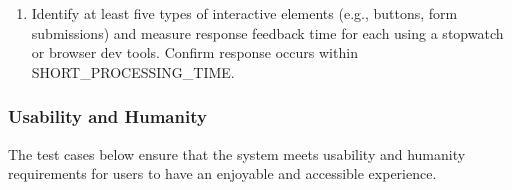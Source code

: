\documentclass[12pt, titlepage]{article}
\begin{document}
\begin{itemize}
\begin{mdframed}[linewidth=0.5mm]
\begin{enumerate}[noitemsep]
      \item Identify at least five types of interactive elements (e.g., buttons, form \\ submissions) and measure response feedback time for each using a stopwatch or browser dev tools. Confirm response occurs within \\ SHORT\_PROCESSING\_TIME.
    \end{enumerate} 
  \end{mdframed}  
\end{itemize}

\subsubsection{Usability and Humanity}
\hspace{2em}The test cases below ensure that the system meets usability and humanity
requirements for users to have an enjoyable and accessible experience.
\end{document}
